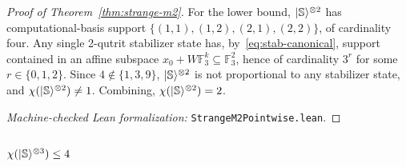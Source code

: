 \documentclass[11pt]{article}
\theoremstyle{definition}
\newcommand{\microspace}{\mspace{0.5mu}}
\newcommand{\ket}[1]{\lvert\microspace #1 \microspace \rangle}
\newcommand{\F}{\mathcal{F}}
\renewcommand{\F}[1]{\mathbb{F}_{#1}}
\newcommand{\chiR}{\chi}
\newcommand{\Strange}{\ket{\mathbb{S}}}
\begin{document}
\begin{proof}[Proof of Theorem~\ref{thm:strange-m2}]
		For the lower bound, $\ket{\mathbb{S}}^{\otimes 2}$ has computational-basis
		support $\{(1,1), (1,2), (2,1), (2,2)\}$, of cardinality four. Any
		single 2-qutrit stabilizer state has, by~\eqref{eq:stab-canonical},
		support contained in an affine subspace
		$x_0 + W \F{3}^k \subseteq \F{3}^2$, hence of cardinality $3^r$ for
		some $r \in \{0, 1, 2\}$. Since $4 \notin \{1, 3, 9\}$,
		$\ket{\mathbb{S}}^{\otimes 2}$ is not proportional to any stabilizer state, and
		$\chiR(\ket{\mathbb{S}}^{\otimes 2}) \ne 1$. Combining,
		$\chiR(\ket{\mathbb{S}}^{\otimes 2}) = 2$.

		\textit{Machine-checked Lean formalization:}
		\texttt{StrangeM2Pointwise.lean}.
	\end{proof}
	
	\subsubsection{\texorpdfstring{$\chiR(\Strange^{\otimes 3}) \le 4$}{chi(S tensor 3) <= 4}}\label{app:strange-m3}
	
\end{document}
